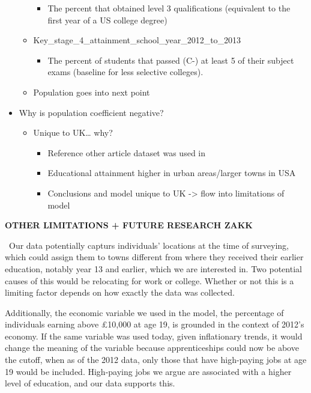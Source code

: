 \documentclass[
  letterpaper,
  DIV=11,
  numbers=noendperiod]{scrartcl}
\providecommand{\tightlist}{%
  \setlength{\itemsep}{0pt}\setlength{\parskip}{0pt}}\usepackage{longtable,booktabs,array}
\begin{document}
\begin{itemize}
\begin{itemize}
    \begin{itemize}
    \tightlist
    \item
      The percent that obtained level 3 qualifications (equivalent to
      the first year of a US college degree)
    \end{itemize}
  \item
    Key\_stage\_4\_attainment\_school\_year\_2012\_to\_2013

    \begin{itemize}
    \tightlist
    \item
      The percent of students that passed (C-) at least 5 of their
      subject exams (baseline for less selective colleges).~
    \end{itemize}
  \item
    Population goes into next point
  \end{itemize}
\item
  Why is population coefficient negative?~

  \begin{itemize}
  \item
    Unique to UK\ldots{} why?~

    \begin{itemize}
    \item
      Reference other article dataset was used in~
    \item
      Educational attainment higher in urban areas/larger towns in USA~
    \item
      Conclusions and model unique to UK -\textgreater{} flow into
      limitations of model
    \end{itemize}
  \end{itemize}
\end{itemize}

\textbf{OTHER LIMITATIONS + FUTURE RESEARCH ZAKK}

~Our data potentially capturs individuals' locations at the time of
surveying, which could assign them to towns different from where they
received their earlier education, notably year 13 and earlier, which we
are interested in. Two potential causes of this would be relocating for
work or college. Whether or not this is a limiting factor depends on how
exactly the data was collected.

Additionally, the economic variable we used in the model, the percentage
of individuals earning above £10,000 at age 19, is grounded in the
context of 2012's economy. If the same variable was used today, given
inflationary trends, it would change the meaning of the variable because
apprenticeships could now be above the cutoff, when as of the 2012 data,
only those that have high-paying jobs at age 19 would be included.
High-paying jobs we argue are associated with a higher level of
education, and our data supports this.~
\end{document}
